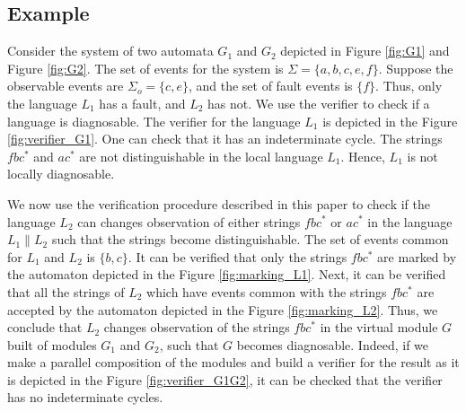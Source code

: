 \subsection{Example}
Consider the system of two automata $G_1$ and $G_2$ depicted in Figure
\ref{fig:G1} and Figure \ref{fig:G2}. The set of events for the system is
$\Sigma = \{a, b, c, e, f\}$. Suppose the observable events are $\Sigma_o = \{c,
e\}$, and the set of fault events is $\{f\}$. Thus, only the language $L_1$ has a
fault, and $L_2$ has not. We use the verifier \cite{yoo_polynomial-time_2002} to
check if a language is diagnosable. The verifier for the language $L_1$ is
depicted in the Figure \ref{fig:verifier_G1}. One can check that it has an
indeterminate cycle.
The strings $fbc^*$ and $ac^*$ are not distinguishable in the local language
$L_1$. Hence, $L_1$ is not locally diagnosable.

We now use the verification procedure described in this paper to check if the
language $L_2$ can changes observation of either strings $fbc^*$ or
$ac^*$ in the language $L_1 \parallel L_2$ such that the strings become
distinguishable. The set of events common for $L_1$ and $L_2$ is $\{b, c\}$. It
can be verified that only the strings $fbc^*$ are marked by the automaton
depicted in the Figure \ref{fig:marking_L1}. Next, it can be verified that all
the strings of $L_2$ which have events common with the strings $fbc^*$ are
accepted by the automaton depicted in the Figure \ref{fig:marking_L2}. Thus, we
conclude that $L_2$ changes observation of the strings $fbc^*$ in the virtual
module $G$ built of modules $G_1$ and $G_2$, such that $G$ becomes diagnosable.
Indeed, if we make a parallel composition of the modules and build a verifier
for the result as it is depicted in the Figure \ref{fig:verifier_G1G2}, it can
be checked that the verifier has no indeterminate cycles.


